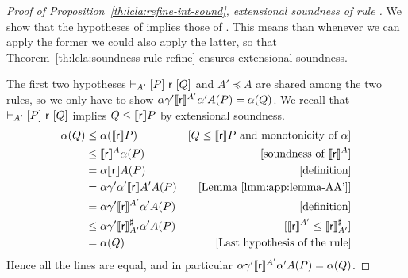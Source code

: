 \begin{proof}[Proof of Proposition~\ref{th:lcla:refine-int-sound}, extensional soundness of rule ]
	We show that the hypotheses of  implies those of . This means than whenever we can apply the former we could also apply the latter, so that Theorem~\ref{th:lcla:soundness-rule-refine} ensures extensional soundness.

	The first two hypotheses $\vdash_{A'}\nobreak[P]~\mathsf{r}~[Q]$ and $A' \preceq A$ are shared among the two rules, so we only have to show $\alpha \gamma' \llbracket\mathsf{r}\rrbracket^{A'} \alpha' A(P) = \alpha(Q)$. We recall that $\vdash_{A'}\nobreak[P]~\mathsf{r}~[Q]$ implies $Q \le \llbracket\mathsf{r}\rrbracket P$ by extensional soundness.
	\begin{align*}
		\alpha(Q) & \le \alpha(\llbracket\mathsf{r}\rrbracket P )                                & [Q \le \llbracket\mathsf{r}\rrbracket P \text{ and monotonicity of }\alpha] \\
		          & \le \llbracket\mathsf{r}\rrbracket^{A} \alpha(P)                             & [\text{soundness of }\llbracket\mathsf{r}\rrbracket^{A}]                    \\
		          & = \alpha \llbracket\mathsf{r}\rrbracket A(P)                                 & [\text{definition}]                                        \\
		          & = \alpha \gamma' \alpha' \llbracket\mathsf{r}\rrbracket A' A(P)              & [\text{Lemma~\ref{lmm:app:lemma-AA'}}]                     \\
		          & = \alpha \gamma' \llbracket\mathsf{r}\rrbracket^{A'} \alpha' A(P)            & [\text{definition}]                                        \\
		          & \le \alpha \gamma' \llbracket\mathsf{r}\rrbracket^{\sharp}_{A'} \alpha' A(P) & [\llbracket\mathsf{r}\rrbracket^{A'} \le \llbracket\mathsf{r}\rrbracket^{\sharp}_{A'}]       \\
		          & = \alpha(Q)                                                 & [\text{Last hypothesis of the rule}]
	\end{align*}
	Hence all the lines are equal, and in particular $\alpha \gamma' \llbracket\mathsf{r}\rrbracket^{A'} \alpha' A(P) = \alpha(Q)$.
\end{proof}

